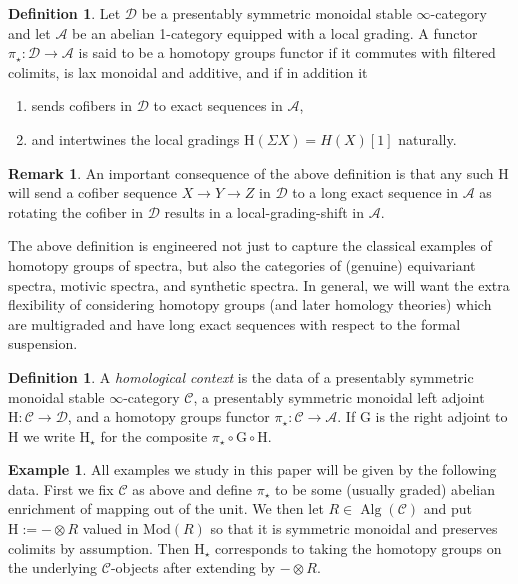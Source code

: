 \documentclass[10pt]{amsart}
\theoremstyle{definition}
\numberwithin{figure}{section}
\numberwithin{equation}{section}
\newtheorem{definition}[figure]{Definition}
\newtheorem{remark}[figure]{Remark}
\newtheorem{example}[figure]{Example}
\newcommand{\cA}{\mathcal{A}}
\newcommand{\cC}{\mathcal{C}}
\newcommand{\cD}{\mathcal{D}}
\theoremstyle{cited}
\newcommand{\Alg}{\operatorname{Alg}}
\newcommand{\Mod}{\mathrm{Mod}}
\renewcommand{\H}{\mathrm{H}}
\newcommand{\G}{\mathrm{G}}
\begin{document}
\begin{definition}
  Let $\cD$ be a presentably symmetric monoidal stable $\infty$-category and let $\cA$ be an abelian 1-category equipped with a local grading. A functor $\pi_\star:\cD\to \cA$ is said to be a homotopy groups functor if it commutes with filtered colimits, is lax monoidal and additive, and if in addition it
  \begin{enumerate}
    \item sends cofibers in $\cD$ to exact sequences in $\cA$,
    \item and intertwines the local gradings $\H(\Sigma X)=H(X)[1]$ naturally.
  \end{enumerate}
\end{definition}

\begin{remark}
  An important consequence of the above definition is that any such $\H$ will send a cofiber sequence $X\to Y\to Z$ in $\cD$ to a long exact sequence in $\cA$ as rotating the cofiber in $\cD$ results in a local-grading-shift in $\cA$.
\end{remark}

The above definition is engineered not just to capture the classical examples of homotopy groups of spectra, but also the categories of (genuine) equivariant spectra, motivic spectra, and synthetic spectra. In general, we will want the extra flexibility of considering homotopy groups (and later homology theories) which are multigraded and have long exact sequences with respect to the formal suspension.

\begin{definition}
  \label{def:homcontext}
  A \textit{homological context} is the data of a presentably symmetric monoidal  stable $\infty$-category $\cC$, a presentably symmetric monoidal left adjoint $\H:\cC\to \cD$, and a homotopy groups functor $\pi_\star:\cC\to \cA$. If $\G$ is the right adjoint to $\H$ we write $\H_\star$ for the composite $\pi_\star\circ \G\circ \H$.
\end{definition}

\begin{example}
  All examples we study in this paper will be given by the following data. First we fix $\cC$ as above and define $\pi_\star$ to be some (usually graded) abelian enrichment of mapping out of the unit. We then let $R\in \Alg(\cC)$ and put $\H:=-\otimes R$ valued in $\Mod(R)$ so that it is symmetric monoidal and preserves colimits by assumption. Then $\H_\star$ corresponds to taking the homotopy groups on the underlying $\cC$-objects after extending by $-\otimes R$.
\end{example}
\end{document}

